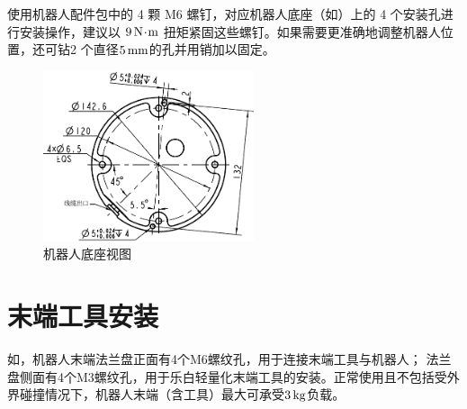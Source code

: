 

使用机器人配件包中的 4 颗 M6 螺钉，对应机器人底座（如）上的 4 个安装孔进行安装操作，建议以 $9\,\mathrm{N\!\cdot\! m}$ 扭矩紧固这些螺钉。如果需要更准确地调整机器人位置，还可钻2 个直径$5 \,\mathrm{mm}$的孔并用销加以固定。


\begin{figure}[htb!]
    \centering
    \includegraphics[height=5cm]{line_graphs/bottom_surface.pdf}
    \caption{机器人底座视图}
    \label{fig:机器人底座视图}
\end{figure}




\section{末端工具安装}

如，机器人末端法兰盘正面有4个M6螺纹孔，用于连接末端工具与机器人；
法兰盘侧面有4个M3螺纹孔，用于乐白轻量化末端工具的安装。正常使用且不包括受外界碰撞情况下，机器人末端（含工具）最大可承受$3\,\mathrm{kg}$负载。

